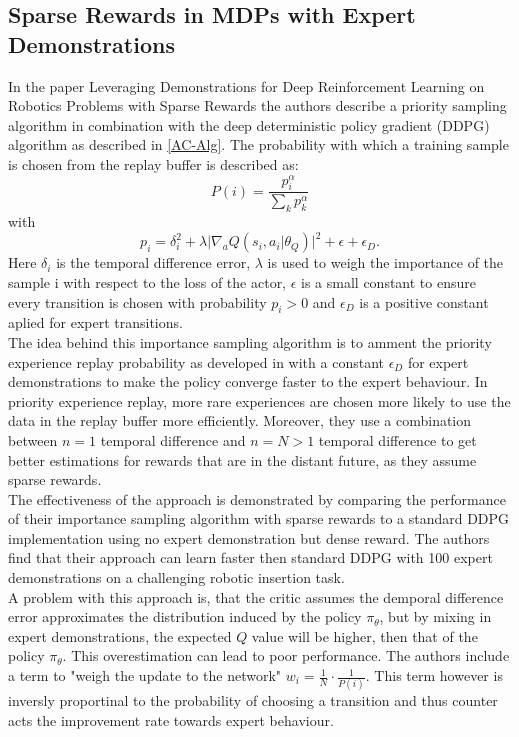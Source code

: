\subsection{Sparse Rewards in MDPs with Expert Demonstrations}
In the paper Leveraging Demonstrations for Deep Reinforcement Learning on Robotics Problems with Sparse Rewards \cite{LDDRLP} the authors describe a priority 
sampling algorithm in combination with the deep deterministic policy gradient (DDPG) algorithm as described in \ref{AC-Alg}. The probability with which a 
training sample is chosen from the replay buffer is described as:
\begin{equation}
    P(i) = \frac{p_i^\alpha}{\sum\limits_{k} p_k^\alpha}
\end{equation}
with 
\begin{equation}
    p_i = \delta_{i}^2 + \lambda \lvert \nabla_a Q(s_i, a_i \vert \theta_Q) \rvert^2 + \epsilon + \epsilon_{D}.
\end{equation}
Here $\delta_{i}$ is the temporal difference error, $\lambda$ is used to weigh the importance of the sample i with respect to the loss of the actor, 
$\epsilon$ is a small constant to ensure every transition is chosen with probability $p_i > 0$ and $\epsilon_D$ is a positive constant aplied for expert transitions.\\
The idea behind this importance sampling algorithm is to amment the priority experience replay probability as developed in \cite{https://arxiv.org/pdf/1511.05952.pdf} 
with a constant $\epsilon_{D}$ for expert demonstrations to make the policy converge faster to the expert behaviour. In priority experience replay, more rare 
experiences are chosen more likely to use the data in the replay buffer more efficiently. Moreover, they use a combination between $n=1$ temporal difference and 
$n=N > 1$ temporal difference to get better estimations for rewards that are in the distant future, as they assume sparse rewards.\\
The effectiveness of the approach is demonstrated by comparing the performance of their importance sampling algorithm with sparse rewards to a standard DDPG 
implementation using no expert demonstration but dense reward. The authors find that their approach can learn faster then standard DDPG with 100 expert 
demonstrations on a challenging robotic insertion task.\\ 
A problem with this approach is, that the critic assumes the demporal difference error approximates the distribution induced by the policy $\pi_{\theta}$, but by 
mixing in expert demonstrations, the expected $Q$ value will be higher, then that of the policy $\pi_{\theta}$. This overestimation can lead to poor performance. 
The authors include a term to "weigh the update to the network" $w_i = \frac{1}{N} \cdot \frac{1}{P(i)}$. This term however is inversly proportinal to the 
probability of choosing a transition and thus counter acts the improvement rate towards expert behaviour.

